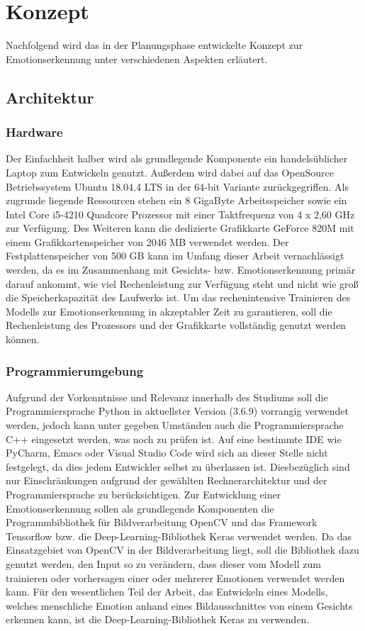 \documentclass[12pt, a4paper]{scrbook}
\begin{document}
\section{Konzept}
Nachfolgend wird das in der Planungsphase entwickelte Konzept zur Emotionserkennung unter verschiedenen Aspekten erläutert.

\subsection{Architektur}

\subsubsection{Hardware}
Der Einfachheit halber wird als grundlegende Komponente ein handelsüblicher Laptop zum Entwickeln genutzt.  Außerdem wird dabei auf das OpenSource Betriebssystem Ubuntu 18.04.4 LTS in der 64-bit Variante zurückgegriffen. Als zugrunde liegende Ressourcen stehen ein 8 GigaByte Arbeitsspeicher sowie ein Intel Core i5-4210 Quadcore Prozessor mit einer Taktfrequenz von 4 x 2,60 GHz zur Verfügung. Des Weiteren kann die dedizierte Grafikkarte GeForce 820M mit einem Grafikkartenspeicher von 2046 MB verwendet werden. Der Festplattenspeicher von 500 GB kann im Umfang dieser Arbeit vernachlässigt werden, da es im Zusammenhang mit Gesichts- bzw. Emotionserkennung primär darauf ankommt, wie viel Rechenleistung zur Verfügung steht und nicht wie groß die Speicherkapazität des Laufwerks ist. Um das rechenintensive Trainieren des Modells zur Emotionserkennung in akzeptabler Zeit zu garantieren, soll die Rechenleistung des Prozessors und der Grafikkarte vollständig genutzt werden können.

\subsubsection{Programmierumgebung}
Aufgrund der Vorkenntnisse und Relevanz innerhalb des Studiums soll die Programmiersprache Python in aktuellster Version (3.6.9) vorrangig verwendet werden, jedoch kann unter gegeben Umständen auch die Programmiersprache C++ eingesetzt werden, was noch zu prüfen ist. Auf eine bestimmte IDE wie PyCharm, Emacs oder Visual Studio Code wird sich an dieser Stelle nicht festgelegt, da dies jedem Entwickler selbst zu überlassen ist. Diesbezüglich sind nur Einschränkungen aufgrund der gewählten Rechnerarchitektur und der Programmiersprache zu berücksichtigen.\newline
Zur Entwicklung einer Emotionserkennung sollen als grundlegende Komponenten die Programmbibliothek für Bildverarbeitung OpenCV und das Framework Tensorflow bzw. die Deep-Learning-Bibliothek Keras verwendet werden. Da das Einsatzgebiet von OpenCV in der Bildverarbeitung liegt, soll die Bibliothek dazu genutzt werden, den Input so zu verändern, dass dieser vom Modell zum trainieren oder vorhersagen einer oder mehrerer Emotionen verwendet werden kann. Für den wesentlichen Teil der Arbeit, das Entwickeln eines Modells, welches menschliche Emotion anhand eines Bildausschnittes von einem Gesichts erkennen kann, ist die Deep-Learning-Bibliothek Keras zu verwenden.
\end{document}
